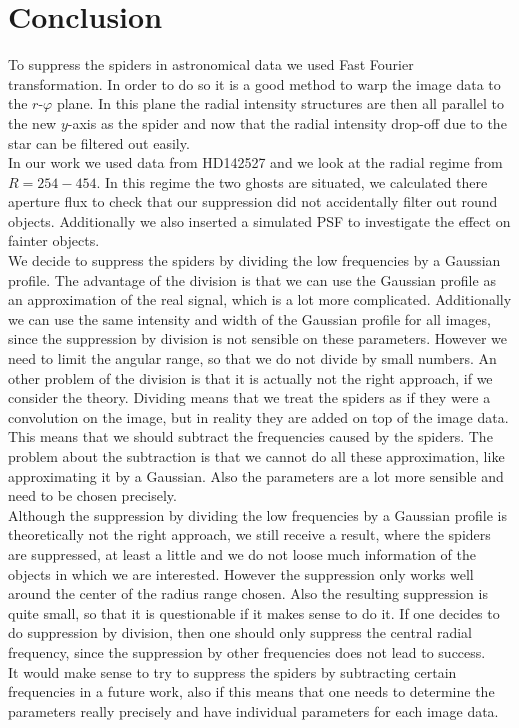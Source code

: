 \section{Conclusion}
To suppress the spiders in astronomical data we used Fast Fourier transformation. In order to do so it is a good method to warp the image data to the $r$-$\varphi$ plane. In this plane the radial intensity structures are then all parallel to the new $y$-axis as the spider and now that the radial intensity drop-off due to the star can be filtered out easily.\\
In our work we used data from HD142527 and we look at the radial regime from $R=254-454$. In this regime the two ghosts are situated, we calculated there aperture flux to check that our suppression did not accidentally filter out round objects. Additionally we also inserted a simulated PSF to investigate the effect on fainter objects. \\
We decide to suppress the spiders by dividing the low frequencies by a Gaussian profile. The advantage of the division is that we can use the Gaussian profile as an approximation of the real signal, which is a lot more complicated. Additionally we can use the same intensity and width of the Gaussian profile for all images, since the suppression by division is not sensible on these parameters. However we need to limit the angular range, so that we do not divide by small numbers. An other problem of the division is that it is actually not the right approach, if we consider the theory. Dividing means that we treat the spiders as if they were a convolution on the image, but in reality they are added on top of the image data. This means that we should subtract the frequencies caused by the spiders. The problem about the subtraction is that we cannot do all these approximation, like approximating it by a Gaussian. Also the parameters are a lot more sensible and need to be chosen precisely. \\
Although the suppression by dividing the low frequencies by a Gaussian profile is theoretically not the right approach, we still receive a result, where the spiders are suppressed, at least a little and we do not loose much information of the objects in which we are interested. However the suppression only works well around the center of the radius range chosen. Also the resulting suppression is quite small, so that it is questionable if it makes sense to do it. If one decides to do suppression by division, then one should only suppress the central radial frequency, since the suppression by other frequencies does not lead to success.\\ 
It would make sense to try to suppress the spiders by subtracting certain frequencies in a future work, also if this means that one needs to determine the parameters really precisely and have individual parameters for each image data. 
 